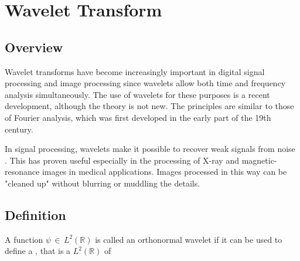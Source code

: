 \section{Wavelet Transform}

\subsection{Overview}
Wavelet transforms have become increasingly important in digital signal processing and image processing since wavelets allow both time and frequency analysis simultaneously. The use of wavelets for these purposes is a recent development, although the theory is not new. The principles are similar to those of Fourier analysis, which was first developed in the early part of the 19th century.

In signal processing, wavelets make it possible to recover weak signals from noise . This has proven useful especially in the processing of X-ray and magnetic-resonance images in medical applications. Images processed in this way can be "cleaned up" without blurring or muddling the details.

\subsection{Definition}
A function $\psi \,\in\, L^2(\mathbb{R})$  is called an
orthonormal wavelet if it can be used to define a
, that is a
$L^2\left(\mathbb{R}\right)$ of

